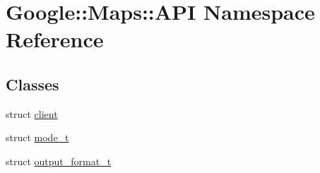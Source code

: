 \hypertarget{a00034}{}\section{Google\+:\+:Maps\+:\+:A\+PI Namespace Reference}
\label{a00034}
\subsection*{Classes}
\begin{DoxyCompactItemize}
\item 
struct \hyperlink{a00040}{client}
\item 
struct \hyperlink{a00044}{mode\+\_\+t}
\item 
struct \hyperlink{a00048}{output\+\_\+format\+\_\+t}
\end{DoxyCompactItemize}
